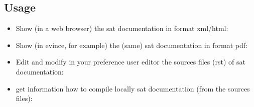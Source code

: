 \documentclass[a4paper,10pt,english]{sphinxmanual}
\begin{document}
\subsection{Usage}
\label{\detokenize{commands/doc:usage}}\begin{itemize}
\item {} 
Show (in a web browser) the sat documentation in format xml/html:

%
\begin{sphinxVerbatim}[commandchars=\\\{\}]
  
\end{sphinxVerbatim}

\item {} 
Show (in evince, for example) the (same) sat documentation in format pdf:

%
\begin{sphinxVerbatim}[commandchars=\\\{\}]
  
\end{sphinxVerbatim}

\item {} 
Edit and modify in your preference user editor the sources files (rst) of sat documentation:

%
\begin{sphinxVerbatim}[commandchars=\\\{\}]
  
\end{sphinxVerbatim}

\item {} 
get information how to compile locally sat documentation (from the sources files):

%
\begin{sphinxVerbatim}[commandchars=\\\{\}]
  
\end{sphinxVerbatim}

\end{itemize}
\end{document}
